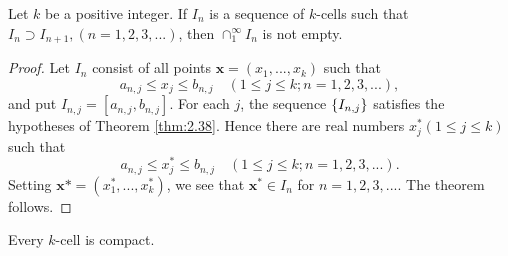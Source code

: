 \begin{thm}
    \label{thm:2.39}
    Let $k$ be a positive integer. 
    If ${I_n}$ is a sequence of $k$-cells such that $I_n \supset I_{n+1}, (n=1,2,3,...)$, 
    then $\cap_1^\infty I_n$ is not empty.
\end{thm}

\begin{proof}
    Let $I_n$ consist of all points $\mathbf{x} = (x_1,...,x_k)$ such that
    \begin{equation*}
        a_{n, j} \leq
        x_j \leq
        b_{n, j} 
        \quad
        (1 \leq j \leq k; n = 1,2,3,...),
    \end{equation*}
    and put $I_{n,j} = [a_{n,j}, b_{n,j}]$. 
    For each $j$, the sequence $\protect\{I_{n,j}\}$ satisfies the hypotheses of Theorem \ref{thm:2.38}. 
    Hence there are real numbers $x_j^*(1 \leq j \leq k)$ such that
    \begin{equation*}
        a_{n,j}
        \leq x_j^* \leq
        b_{n,j}
        \quad
        (1 \leq j \leq k; n = 1, 2, 3, ... ).
    \end{equation*}
    Setting $\mathbf{x}* = (x_1^*, ... , x_k^*)$, 
    we see that $\mathbf{x}^* \in I_n$ for $n = 1, 2, 3, ...$.
    The theorem follows.
\end{proof}

\begin{thm}
    \label{thm:2.40}
    Every $k$-cell is compact.
\end{thm}

